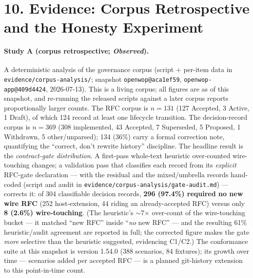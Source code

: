 \documentclass[11pt]{article}
\begin{document}
\section*{10. Evidence: Corpus Retrospective and the Honesty Experiment}
\paragraph{Study A (corpus retrospective; \emph{Observed}).} A deterministic analysis of the
governance corpus (script + per-item data in \texttt{evidence/corpus-analysis/}; snapshot
\texttt{openwop@aca1ef59}, \texttt{openwop-app@409d4424}, 2026-07-13). This is a living corpus; all
figures are as of this snapshot, and re-running the released scripts against a later corpus reports
proportionally larger counts. The RFC corpus is $n=131$ (127 Accepted, 3 Active, 1 Draft), of which
124 record at least one lifecycle transition. The decision-record corpus is $n=369$ (308 implemented,
43 Accepted, 7 Superseded, 5 Proposed, 1 Withdrawn, 5 other/unparsed); 134 (36\%) carry a formal
correction note, quantifying the ``correct, don't rewrite history'' discipline. The headline result
is the \emph{contract-gate distribution}. A first-pass whole-text heuristic over-counted wire-touching
changes; a validation pass that classifies each record from its \emph{explicit} RFC-gate declaration
--- with the residual and the mixed/umbrella records hand-coded (script and audit in
\texttt{evidence/corpus-analysis/gate-audit.md}) --- corrects it: of 304 classifiable decision
records, \textbf{296 (97.4\%) required no new wire RFC} (252 host-extension, 44 riding an
already-accepted RFC) versus only \textbf{8 (2.6\%) wire-touching}. (The heuristic's
$\sim$7$\times$ over-count of the wire-touching bucket --- it matched ``new RFC'' inside ``\emph{no}
new RFC'' --- and the resulting 61\% heuristic/audit agreement are reported in full; the corrected
figure makes the gate \emph{more} selective than the heuristic suggested, evidencing C1/C2.)
The conformance suite at this snapshot is version 1.54.0 (388 scenarios, 84 fixtures); its growth over
time --- scenarios added per accepted RFC --- is a planned git-history extension to this point-in-time
count.

\end{document}
